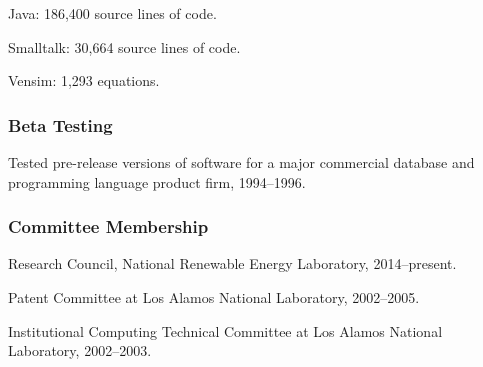 \documentclass[]{article}
\begin{document}
Java: 186,400 source lines of code.

Smalltalk: 30,664 source lines of code.

Vensim: 1,293 equations.

\subsubsection{Beta Testing}\label{beta-testing}

Tested pre-release versions of software for a major commercial database
and programming language product firm, 1994--1996.

\subsubsection{Committee Membership}\label{committee-membership}

Research Council, National Renewable Energy Laboratory, 2014--present.

Patent Committee at Los Alamos National Laboratory, 2002--2005.

Institutional Computing Technical Committee at Los Alamos National
Laboratory, 2002--2003.
\end{document}
